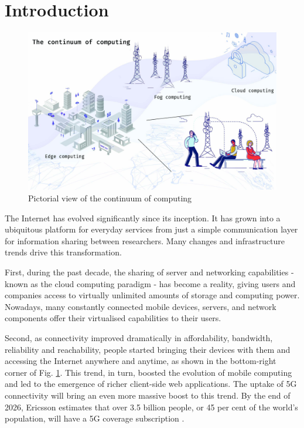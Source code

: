 \section{Introduction}
\label{sec:introduction}

\begin{figure}[ht]
\centering
\includegraphics[width=\textwidth]{figures/continuum}
\caption{Pictorial view of the continuum of computing \label{fig:continuum}}
\end{figure}

The Internet has evolved significantly since its inception. It has grown into a ubiquitous platform for everyday services from just a simple communication layer for information sharing between researchers. Many changes and infrastructure trends drive this transformation.

First, during the past decade, the sharing of server and networking capabilities - known as the cloud computing para\-digm - has become a reality, giving users and companies access to virtually unlimited amounts of storage and computing power. Nowadays, many constantly connected mobile devices, servers, and network components offer their virtualised capabilities to their users.

Second, as connectivity improved dramatically in affordability, bandwidth, reliability and reachability, people started bringing their devices with them and accessing the Internet anywhere and anytime, as shown in the bottom-right corner of Fig. \ref{fig:continuum}. This trend, in turn, boosted the evolution of mobile computing and led to the emergence of richer client-side web applications. The uptake of 5G connectivity will bring an even more massive boost to this trend. By the end of 2026, Ericsson estimates that over 3.5 billion people, or 45 per cent of the world's population, will have a 5G coverage subscription \cite{ericsson-5g}.

